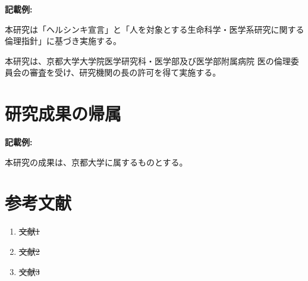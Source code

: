 \documentclass{kyodai-protocol}
\providecommand{\DIFdel}[1]{{\protect\color{red}\sout{#1}}}                      %
\providecommand{\DIFaddbegin}{} %
\providecommand{\DIFaddend}{} %
\providecommand{\DIFdelbegin}{} %
\providecommand{\DIFdelend}{} %
\begin{document}
\textbf{記載例:}

本研究は「ヘルシンキ宣言」と「人を対象とする生命科学・医学系研究に関する倫理指針」に基づき実施する。

本研究は、京都大学大学院医学研究科・医学部及び医学部附属病院 医の倫理委員会の審査を受け、研究機関の長の許可を得て実施する。

\section{研究成果の帰属}
\label{sec:ownership}

\textbf{記載例:}

本研究の成果は、京都大学に属するものとする。

\section{参考文献}
\label{sec:references}

\DIFdelbegin %
\begin{enumerate}%
\item%
\DIFdel{文献1
}%
\item%
\DIFdel{文献2
}%
\item%
\DIFdel{文献3
}
\end{enumerate}%
\DIFdelend \DIFaddbegin \vspace{-2em}  %
\renewcommand{\refname}{}  %


\DIFaddend 
\end{document}
